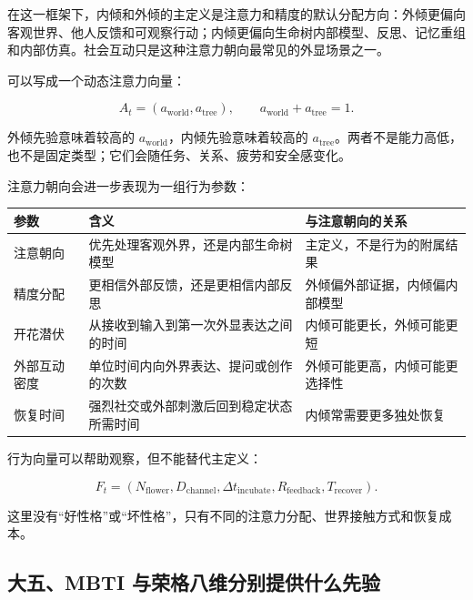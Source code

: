 \documentclass[UTF8,a4paper,11pt]{ctexart}
\begin{document}
在这一框架下，内倾和外倾的主定义是注意力和精度的默认分配方向：外倾更偏向客观世界、他人反馈和可观察行动；内倾更偏向生命树内部模型、反思、记忆重组和内部仿真。社会互动只是这种注意力朝向最常见的外显场景之一。

可以写成一个动态注意力向量：

\begin{equation}
A_t=(a_{\mathrm{world}},a_{\mathrm{tree}}),\qquad a_{\mathrm{world}}+a_{\mathrm{tree}}=1.
\end{equation}

外倾先验意味着较高的 $a_{\mathrm{world}}$，内倾先验意味着较高的 $a_{\mathrm{tree}}$。两者不是能力高低，也不是固定类型；它们会随任务、关系、疲劳和安全感变化。

注意力朝向会进一步表现为一组行为参数：

\begin{center}
\begin{longtable}{@{}p{3.2cm}p{4.2cm}p{5.7cm}@{}}
\toprule
\textbf{参数} & \textbf{含义} & \textbf{与注意朝向的关系} \\
\midrule
注意朝向 & 优先处理客观外界，还是内部生命树模型 & 主定义，不是行为的附属结果 \\
精度分配 & 更相信外部反馈，还是更相信内部反思 & 外倾偏外部证据，内倾偏内部模型 \\
开花潜伏 & 从接收到输入到第一次外显表达之间的时间 & 内倾可能更长，外倾可能更短 \\
外部互动密度 & 单位时间内向外界表达、提问或创作的次数 & 外倾可能更高，内倾可能更选择性 \\
恢复时间 & 强烈社交或外部刺激后回到稳定状态所需时间 & 内倾常需要更多独处恢复 \\
\bottomrule
\end{longtable}
\end{center}

行为向量可以帮助观察，但不能替代主定义：

\begin{equation}
F_t=(N_{\mathrm{flower}},D_{\mathrm{channel}},\Delta t_{\mathrm{incubate}},R_{\mathrm{feedback}},T_{\mathrm{recover}}).
\end{equation}

这里没有“好性格”或“坏性格”，只有不同的注意力分配、世界接触方式和恢复成本。

\subsection{大五、MBTI 与荣格八维分别提供什么先验}
\end{document}
